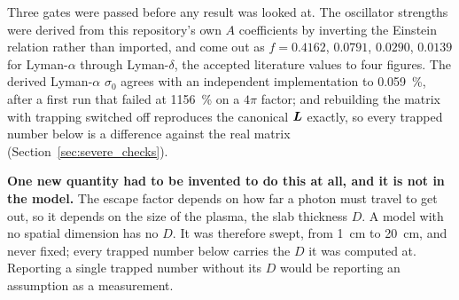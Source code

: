 Three gates were passed before any result was looked at. The oscillator
strengths were derived from this repository's own $A$ coefficients by inverting
the Einstein relation rather than imported, and come out as $f = 0.4162$,
$0.0791$, $0.0290$, $0.0139$ for Lyman-$\alpha$ through Lyman-$\delta$, the
accepted literature values to four figures. The derived Lyman-$\alpha$
$\sigma_0$ agrees with an independent implementation to \SI{0.059}{\percent},
after a first run that failed at \SI{1156}{\percent} on a $4\pi$ factor; and
rebuilding the matrix with trapping switched off reproduces the canonical
$\bm{L}$ exactly, so every trapped number below is a difference against the real
matrix (Section~\ref{sec:severe_checks}).

\textbf{One new quantity had to be invented to do this at all, and it is not in
the model.} The escape factor depends on how far a photon must travel to get
out, so it depends on the size of the plasma, the slab thickness $D$. A model
with no spatial dimension has no $D$. It was therefore swept, from
\SI{1}{\centi\metre} to \SI{20}{\centi\metre}, and never fixed; every trapped
number below carries the $D$ it was computed at. Reporting a single trapped
number without its $D$ would be reporting an assumption as a measurement.

